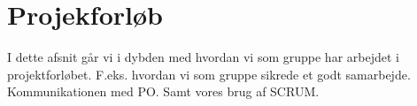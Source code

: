 \section{Projekforløb}
\label{sec:projekt}
I dette afsnit går vi i dybden med hvordan vi som gruppe har arbejdet i projektforløbet. F.eks. hvordan vi som gruppe sikrede et godt samarbejde. Kommunikationen med PO. Samt vores brug af SCRUM.



